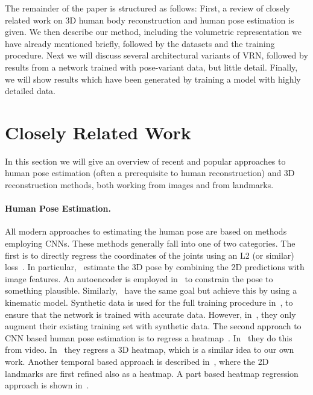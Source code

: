 The remainder of the paper is structured as follows: First, a review
of closely related work on 3D human body reconstruction and human pose
estimation is given. We then describe our method, including the
volumetric representation we have already mentioned briefly, followed
by the datasets and the training procedure. Next we will discuss
several architectural variants of VRN, followed by results from a
network trained with pose-variant data, but little detail. Finally, we
will show results which have been generated by training a model with
highly detailed data.





\section{Closely Related Work}


In this section we will give an overview of recent and popular
approaches to human pose estimation (often a prerequisite to human
reconstruction) and 3D reconstruction methods, both working from
images and from landmarks.

\paragraph{Human Pose Estimation.} All modern approaches to estimating
the human pose are based on methods employing CNNs. These methods
generally fall into one of two categories. The first is to directly
regress the coordinates of the joints using an L2 (or similar)
loss~\cite{li20143d,park20163d,tekin2016structured,tekin2016direct,zhou2016deep,chen2016synthesizing,ghezelghieh2016learning}.
In particular,~\cite{park20163d} estimate the 3D pose by combining the
2D predictions with image features. An autoencoder is employed
in~\cite{tekin2016structured} to constrain the pose to something
plausible. Similarly,~\cite{zhou2016deep} have the same goal but
achieve this by using a kinematic model. Synthetic data is used for
the full training procedure in~\cite{chen2016synthesizing}, to ensure
that the network is trained with accurate data. However,
in~\cite{ghezelghieh2016learning}, they only augment their existing
training set with synthetic data. The second approach to CNN based
human pose estimation is to regress a
heatmap~\cite{zhou2016sparseness,pavlakos2017coarse,mehta2017vnect,bulat2016human}. In~\cite{zhou2016sparseness}
they do this from video. In~\cite{pavlakos2017coarse} they regress a
3D heatmap, which is a similar idea to our own work. Another temporal
based approach is described in~\cite{mehta2017vnect}, where the 2D
landmarks are first refined also as a heatmap. A part based heatmap
regression approach is shown in~\cite{bulat2016human}.

